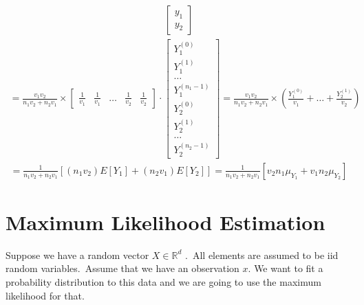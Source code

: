 \documentclass[12pt]{article}
\begin{document}
\begin{qsolve}[solution]
\begin{align*}
\begin{bmatrix}
            y_1 \\
            y_2
        \end{bmatrix}
    \end{align*}
    \begin{align*}
        = \frac{v_1 v_2}{n_1 v_2 + n_2 v_1} \times \begin{bmatrix}
            \frac{1}{v_1} & \frac{1}{v_1} & \hdots & \frac{1}{v_2} & \frac{1}{v_2}
        \end{bmatrix} \cdot
        \begin{bmatrix}
            Y_1^{(0)}     \\
            Y_1^{(1)}     \\
            \hdots        \\
            Y_1^{(n_1-1)} \\
            Y_2^{(0)}     \\
            Y_2^{(1)}     \\
            \hdots        \\
            Y_2^{(n_2-1)}
        \end{bmatrix}
        =  \frac{v_1 v_2}{n_1 v_2 + n_2 v_1} \times(\frac{Y_1^{(0)}}{v_1} + \hdots + \frac{Y_2^{(1)}}{v_2})
    \end{align*}
    \begin{align*}
        =  \frac{1}{n_1 v_2 + n_2 v_1}[(n_1 v_2) E[Y_1] + (n_2 v_1) E[Y_2]] = \frac{1}{n_1 v_2 + n_2 v_1}[v_2 n_1 \mu_{Y_1} + v_1 n_2 \mu_{Y_2} ]
    \end{align*}
\end{qsolve}
\section{Maximum Likelihood Estimation}
Suppose we have a random vector $X \in \mathbb{R}^d$ .\, All elements are assumed to be iid random variables.\, Assume that we have an observation $x$. We want to fit a probability distribution to this data and we are going to use the maximum likelihood for that.
\end{document}
